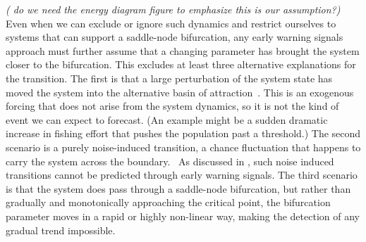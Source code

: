 \documentclass[authoryear,preprint,11pt]{elsarticle}
\newcommand{\cb}[1]{{\it \color{darkgreen} (#1)}}
\begin{document}
\cb{ do we need the energy diagram figure to emphasize this is our assumption?}
Even when we can exclude or ignore such dynamics and 
restrict ourselves to systems that can support a saddle-node bifurcation,
any early warning signals approach must further assume that a changing parameter 
has brought the system closer to the bifurcation.  This excludes at least three alternative
explanations for the transition.  
The first is that a large perturbation of the system state 
has moved the system into the alternative basin of attraction~\citep{Scheffer2001, Scheffer2001}.  
This is an exogenous forcing that does not arise from the system dynamics, so it is not the kind of event we can expect to forecast. 
(An example might be a sudden dramatic increase in fishing effort that pushes the population past a threshold.)
The second scenario is a purely noise-induced transition, a chance fluctuation that happens to carry the system across the boundary.~\citep{Ditlevsen2010}  
As discussed in \citet{Livina2012}, such noise induced transitions cannot be predicted through early warning signals.  
The third scenario is that the system does pass through a saddle-node bifurcation, 
but rather than gradually and monotonically approaching the critical point, the 
bifurcation parameter moves in a rapid or highly non-linear way, making the detection of any gradual trend impossible.  

\end{document}

